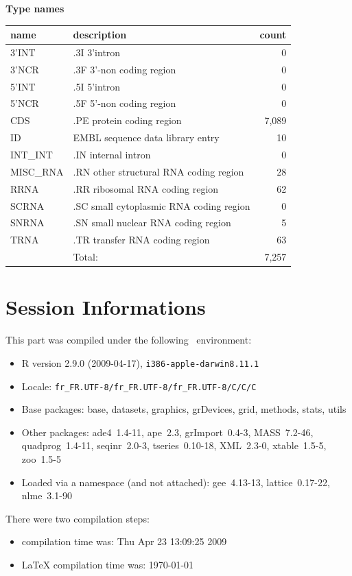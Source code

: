 \documentclass{article}
\begin{document}
\begin{Schunk}
\textbf{Type names}
\noindent\begin{tabular}{llr}
\hline \hline
name & description & count \\
\hline
3'INT  &  .3I 3'intron  &  0 \\
3'NCR  &  .3F  3'-non coding region  &  0 \\
5'INT  &  .5I 5'intron  &  0 \\
5'NCR  &  .5F  5'-non coding region  &  0 \\
CDS  &  .PE protein coding region  &  7,089 \\
ID  &  EMBL sequence data library entry  &  10 \\
INT\_INT  &  .IN  internal intron  &  0 \\
MISC\_RNA  &  .RN other structural RNA coding region  &  28 \\
RRNA  &  .RR ribosomal RNA coding region  &  62 \\
SCRNA  &  .SC small cytoplasmic RNA coding region  &  0 \\
SNRNA  &  .SN small nuclear RNA coding region  &  5 \\
TRNA  &  .TR transfer RNA coding region  &  63 \\
\hline
 & Total: & 7,257 \\
\hline \hline
\end{tabular}\end{Schunk}


\section*{Session Informations}

\begin{scriptsize}

This part was compiled under the following \Rlogo{}~environment:

\begin{itemize}
  \item R version 2.9.0 (2009-04-17), \verb|i386-apple-darwin8.11.1|
  \item Locale: \verb|fr_FR.UTF-8/fr_FR.UTF-8/fr_FR.UTF-8/C/C/C|
  \item Base packages: base, datasets, graphics, grDevices, grid,
    methods, stats, utils
  \item Other packages: ade4~1.4-11, ape~2.3, grImport~0.4-3,
    MASS~7.2-46, quadprog~1.4-11, seqinr~2.0-3, tseries~0.10-18,
    XML~2.3-0, xtable~1.5-5, zoo~1.5-5
  \item Loaded via a namespace (and not attached): gee~4.13-13,
    lattice~0.17-22, nlme~3.1-90
\end{itemize}
There were two compilation steps:

\begin{itemize}
  \item \Rlogo{} compilation time was: Thu Apr 23 13:09:25 2009
  \item \LaTeX{} compilation time was: \today
\end{itemize}

\end{scriptsize}


\clearpage
{}


\end{document}

